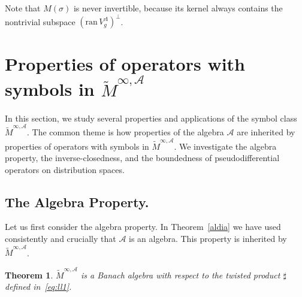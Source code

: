 \documentclass[12pt]{amsart}
\newtheorem{theorem}{Theorem}[section]
\theoremstyle{definition}
\theoremstyle{remark}
\numberwithin{equation}{section}
\newcommand{\psdo}{pseudodifferential operator}
\newcommand{\symbo}{\widetilde M^{\infty, \cA}}
\def\cA{\mathcal{A}}
\def\cA{\mathcal{A}}
\newcommand{\Cal}{\mathcal}
\newcommand{\La}{\Lambda}
\newcommand{\ac}{\Cal A}
\begin{document}
Note that $M(\sigma ) $ is never invertible, because its kernel
always
contains the nontrivial subspace $  (\mathrm{ran}\, V_g^\La
)^\perp$.


\section{Properties of operators with symbols in $\widetilde M^{\infty,\Cal A}$}

In this section, we study  several properties and applications of
the symbol class $\symbo $. The common theme is how  properties of
the algebra $\cA $ are inherited by properties of operators with
symbols in $\symbo $.  We investigate the algebra property, the
inverse-closedness, and the  boundedness of \psdo s on distribution spaces.

\subsection{The Algebra Property.} Let us first consider the algebra
property. In Theorem~\ref{aldia} we have used consistently and
crucially that $\cA $ is an algebra. This property is inherited by
$\symbo $.

\begin{theorem}\label{sjowei}
$\widetilde M^{\infty,\ac}$ is a Banach algebra with respect
to the twisted product $\sharp$ defined in~\eqref{eq:ll1}.
\end{theorem}
\end{document}
